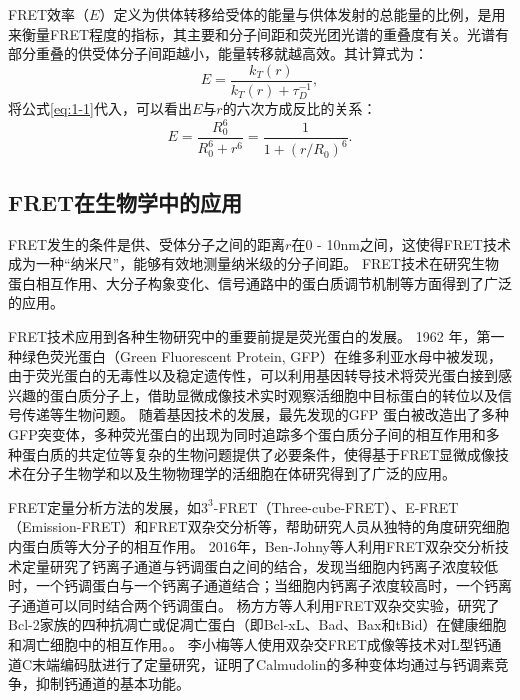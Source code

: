 FRET效率（$E$）定义为供体转移给受体的能量与供体发射的总能量的比例，是用来衡量FRET程度的指标，其主要和分子间距和荧光团光谱的重叠度有关。光谱有部分重叠的供受体分子间距越小，能量转移就越高效。其计算式为：
\begin{equation}
    {E}=\frac{k_T(r)}{k_T(r)+\tau^{-1}_{D}},
\end{equation}
将公式\ref{eq:1-1}代入，可以看出$E$与$r$的六次方成反比的关系：
\begin{equation}
    E=\frac{R_0^6}{R_0^6+r^6}=\frac{1}{1+(r/R_0)^6}.
\end{equation}
\fi

\subsection{FRET在生物学中的应用}

FRET发生的条件是供、受体分子之间的距离$r$在0 - 10nm之间，这使得FRET技术成为一种“纳米尺”，能够有效地测量纳米级的分子间距。
FRET技术在研究生物蛋白相互作用、大分子构象变化、信号通路中的蛋白质调节机制等方面得到了广泛的应用。

FRET技术应用到各种生物研究中的重要前提是荧光蛋白的发展。
1962 年，第一种绿色荧光蛋白（Green Fluorescent Protein, GFP）在维多利亚水母中被发现，由于荧光蛋白的无毒性以及稳定遗传性，可以利用基因转导技术将荧光蛋白接到感兴趣的蛋白质分子上，借助显微成像技术实时观察活细胞中目标蛋白的转位以及信号传递等生物问题。
随着基因技术的发展，最先发现的GFP 蛋白被改造出了多种GFP突变体，多种荧光蛋白的出现为同时追踪多个蛋白质分子间的相互作用和多种蛋白质的共定位等复杂的生物问题提供了必要条件，使得基于FRET显微成像技术在分子生物学和以及生物物理学的活细胞在体研究得到了广泛的应用。

FRET定量分析方法的发展，如$3^3$-FRET（Three-cube-FRET）、E-FRET（Emission-FRET）和FRET双杂交分析等，帮助研究人员从独特的角度研究细胞内蛋白质等大分子的相互作用。
2016年，Ben-Johny等人利用FRET双杂交分析技术定量研究了钙离子通道与钙调蛋白之间的结合，发现当细胞内钙离子浓度较低时，一个钙调蛋白与一个钙离子通道结合；当细胞内钙离子浓度较高时，一个钙离子通道可以同时结合两个钙调蛋白。
杨方方等人利用FRET双杂交实验，研究了Bcl-2家族的四种抗凋亡或促凋亡蛋白（即Bcl-xL、Bad、Bax和tBid）在健康细胞和凋亡细胞中的相互作用。。
李小梅等人使用双杂交FRET成像等技术对L型钙通道C末端编码肽进行了定量研究，证明了Calmudolin的多种变体均通过与钙调素竞争，抑制钙通道的基本功能。

